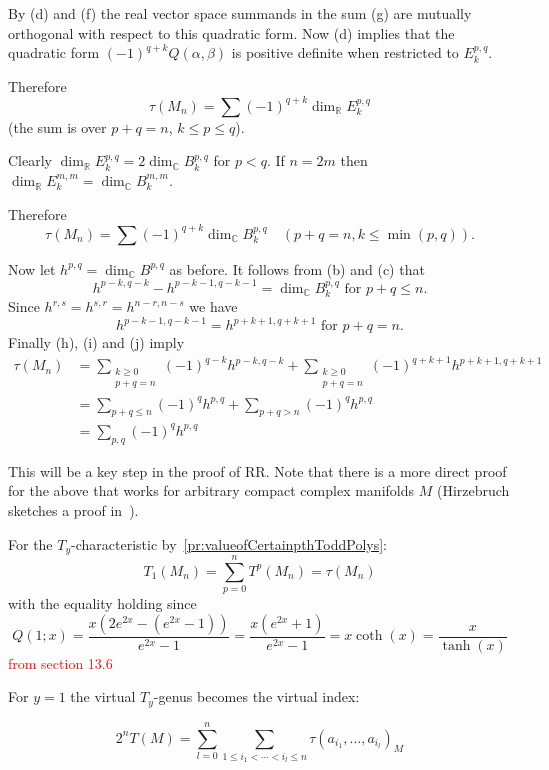 \documentclass{book}
\begin{document}
\begin{Proof}
By (d) and (f) the real vector space summands in the sum (g) are mutually orthogonal with respect to this quadratic form. Now (d) implies that the quadratic form $(-1)^{q+k}Q(\alpha,\beta)$ is positive definite when restricted to $E_k^{p,q}$.

Therefore
\[
    \tau(M_n) = \sum (-1)^{q+k} \dim_{\mathbb{R}} E_k^{p,q}
\]
(the sum is over $p+q=n$, $k \leq p \leq q$).

Clearly $\dim_{\mathbb{R}} E_k^{p,q} = 2\dim_{\mathbb{C}} B_k^{p,q}$ for $p < q$. If $n=2m$ then $\dim_{\mathbb{R}} E_k^{m,m} = \dim_{\mathbb{C}} B_k^{m,m}$.

Therefore
\[
    \tau(M_n) = \sum (-1)^{q+k} \dim_{\mathbb{C}} B_k^{p,q} \quad (p+q=n, k \leq \min(p,q)).
\]

Now let $h^{p,q} = \dim_{\mathbb{C}} B^{p,q}$ as before. It follows from (b) and (c) that
\[
    h^{p-k,q-k} - h^{p-k-1,q-k-1} = \dim_{\mathbb{C}} B_k^{p,q} \text{ for } p+q \leq n.
\]
Since $h^{r,s} = h^{s,r} = h^{n-r,n-s}$ we have
\[
    h^{p-k-1,q-k-1} = h^{p+k+1,q+k+1} \text{ for } p+q=n.
\]
Finally (h), (i) and (j) imply
\begin{align*}
  \tau(M_n) &= \sum_{\substack{k \geq 0 \\ p+q=n}} (-1)^{q-k}h^{p-k,q-k} + \sum_{\substack{k \geq 0 \\ p+q=n}} (-1)^{q+k+1}h^{p+k+1,q+k+1} \\
    &= \sum_{p+q \leq n} (-1)^qh^{p,q} + \sum_{p+q>n} (-1)^qh^{p,q} \\
    &= \sum_{p,q} (-1)^qh^{p,q}
\end{align*}


\end{Proof}

This will be a key step in the proof of RR. Note that there is a more direct proof for the above that works
for arbitrary compact complex manifolds $M$ (Hirzebruch sketches a proof
in~\cite[appendix~25.4]{hirzebruchTopologicalMethodsAlgebraic1995}).

For the $T_y$-characteristic by~\cref{pr:valueofCertainpthToddPolys}:
\[
  T_{1}(M_n) = \sum_{p=0}^n  T^p(M_n) = \tau(M_n)
\]
with the equality holding since
\[
    Q(1;x) = \frac{x(2e^{2x} - (e^{2x} - 1))}{e^{2x} - 1} = \frac{x(e^{2x} + 1)}{e^{2x} - 1} = x\coth(x) = \frac{x}{\tanh(x)}
\]
\textcolor{red}{from section 13.6}

For $y=1$ the virtual $T_y$-genus becomes the virtual index:

\[
2^n T(M) = \sum_{l=0}^n \sum_{1\leq i_1<\cdots<i_l\leq n} \tau(a_{i_1},\ldots,a_{i_l})_M \tag{13*}
\]
\end{document}
